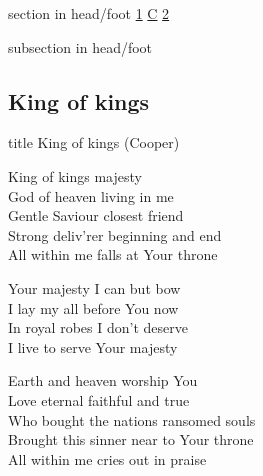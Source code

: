 \documentclass{beamer}
\begin{document}
{
{ 
 {
 \begin{beamercolorbox}[ht=4.5ex,dp=1.5ex,%
      leftskip=.3cm,rightskip=.3cm plus1fil]{section in head/foot}
 \fontsize{12}{25}\selectfont 
\hyperlink{King of kings[](Cooper)1}{1}
\hyperlink{King of kings[](Cooper)C}{C}
\hyperlink{King of kings[](Cooper)2}{2}
 
 \end{beamercolorbox}%
  \begin{beamercolorbox}[ht=2.5ex,dp=1.125ex,%
   leftskip=.3cm,rightskip=.3cm plus1fil]{subsection in head/foot}
   \insertauthor
 \end{beamercolorbox}%
 }
}
\subsection{ King of kings }

\hypertarget{King of kings[](Cooper)}{}
\begin{frame}{}
 \vfill
  \centering
  \begin{beamercolorbox}[sep=8pt,center,shadow=true,rounded=true]{title}
    King of kings (Cooper)    
  \end{beamercolorbox}
  \vfill
\end{frame}

\hypertarget{King of kings[](Cooper)1}{}
\begin{frame}{}
\fontsize{ 18 }{ 23 }\selectfont

King of kings majesty\\ 
God of heaven living in me\\ 
Gentle Saviour closest friend\\ 
Strong deliv'rer beginning and end\\ 
All within me falls at Your throne 

\end{frame}

\hypertarget{King of kings[](Cooper)C}{}
\begin{frame}{}
\fontsize{ 18 }{ 23 }\selectfont

Your majesty I can but bow\\ 
I lay my all before You now\\ 
In royal robes I don't deserve\\ 
I live to serve Your majesty 

\end{frame}

\hypertarget{King of kings[](Cooper)2}{}
\begin{frame}{}
\fontsize{ 18 }{ 23 }\selectfont

Earth and heaven worship You\\ 
Love eternal faithful and true\\ 
Who bought the nations ransomed souls\\ 
Brought this sinner near to Your throne\\ 
All within me cries out in praise 

\end{frame}

}
\end{document}
